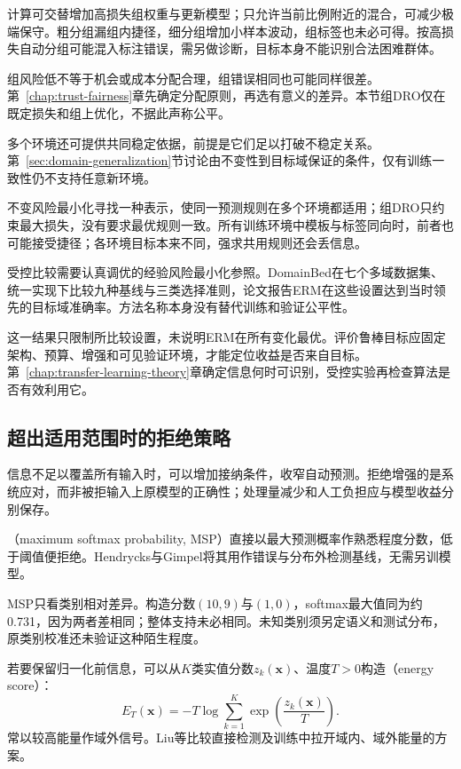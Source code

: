 计算可交替增加高损失组权重与更新模型；只允许当前比例附近的混合，可减少极端保守。粗分组漏组内捷径，细分组增加小样本波动，组标签也未必可得。按高损失自动分组可能混入标注错误，需另做诊断，目标本身不能识别合法困难群体。

组风险低不等于机会或成本分配合理，组错误相同也可能同样很差。第~\ref{chap:trust-fairness}章先确定分配原则，再选有意义的差异。本节组DRO仅在既定损失和组上优化，不据此声称公平。

多个环境还可提供共同稳定依据，前提是它们足以打破不稳定关系。第~\ref{sec:domain-generalization}节讨论由不变性到目标域保证的条件，仅有训练一致性仍不支持任意新环境。

不变风险最小化寻找一种表示，使同一预测规则在多个环境都适用；组DRO只约束最大损失，没有要求最优规则一致。所有训练环境中模板与标签同向时，前者也可能接受捷径；各环境目标本来不同，强求共用规则还会丢信息。

受控比较需要认真调优的经验风险最小化参照。DomainBed在七个多域数据集、统一实现下比较九种基线与三类选择准则，论文报告ERM在这些设置达到当时领先的目标域准确率。方法名称本身没有替代训练和验证公平性。

这一结果只限制所比较设置，未说明ERM在所有变化最优。评价鲁棒目标应固定架构、预算、增强和可见验证环境，才能定位收益是否来自目标。第~\ref{chap:transfer-learning-theory}章确定信息何时可识别，受控实验再检查算法是否有效利用它。

\subsection{超出适用范围时的拒绝策略}
\label{sec:robustness-rejection}

信息不足以覆盖所有输入时，可以增加接纳条件，收窄自动预测。拒绝增强的是系统应对，而非被拒输入上原模型的正确性；处理量减少和人工负担应与模型收益分别保存。

（maximum softmax probability, MSP）直接以最大预测概率作熟悉程度分数，低于阈值便拒绝。Hendrycks与Gimpel将其用作错误与分布外检测基线，无需另训模型。

MSP只看类别相对差异。构造分数$(10,9)$与$(1,0)$，softmax最大值同为约0.731，因为两者差相同；整体支持未必相同。未知类别须另定语义和测试分布，原类别校准还未验证这种陌生程度。

若要保留归一化前信息，可以从$K$类实值分数$z_k(\bm{x})$、温度$T>0$构造（energy score）：
\begin{equation}
 E_T(\bm{x})=-T\log\sum_{k=1}^{K}
       \exp\!\left(\frac{z_k(\bm{x})}{T}\right).
 \label{eq:robustness-energy}
\end{equation}
常以较高能量作域外信号。Liu等比较直接检测及训练中拉开域内、域外能量的方案。

